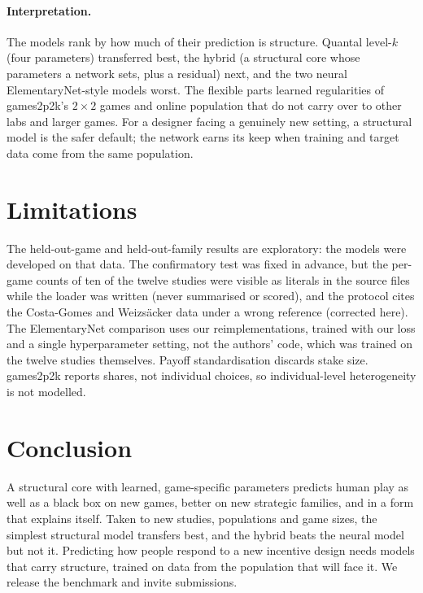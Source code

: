\documentclass[11pt]{article}
\begin{document}
\paragraph{Interpretation.} The models rank by how much of their prediction is structure. Quantal
level-$k$ (four parameters) transferred best, the hybrid (a structural core whose parameters a
network sets, plus a residual) next, and the two neural ElementaryNet-style models worst. The
flexible parts learned regularities of games2p2k's $2\times2$ games and online population that do
not carry over to other labs and larger games. For a designer facing a genuinely new setting, a
structural model is the safer default; the network earns its keep when training and target data
come from the same population.

\section{Limitations}

The held-out-game and held-out-family results are exploratory: the models were developed on that
data. The confirmatory test was fixed in advance, but the per-game counts of ten of the twelve
studies were visible as literals in the source files while the loader was written (never
summarised or scored), and the protocol cites the Costa-Gomes and Weizs\"acker data under a wrong
reference (corrected here). The ElementaryNet comparison uses our reimplementations, trained with
our loss and a single hyperparameter setting, not the authors' code, which was trained on the
twelve studies themselves. Payoff standardisation discards stake size. games2p2k reports shares,
not individual choices, so individual-level heterogeneity is not modelled.

\section{Conclusion}

A structural core with learned, game-specific parameters predicts human play as well as a black
box on new games, better on new strategic families, and in a form that explains itself. Taken to
new studies, populations and game sizes, the simplest structural model transfers best, and the
hybrid beats the neural model but not it. Predicting how people respond to a new incentive design
needs models that carry structure, trained on data from the population that will face it. We
release the benchmark and invite submissions.
\end{document}

